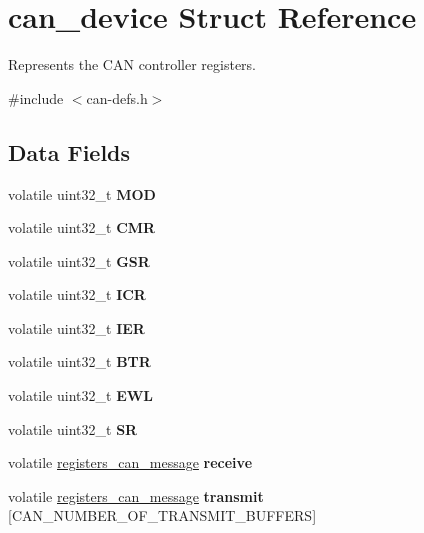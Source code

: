 \hypertarget{structcan__device}{}\section{can\+\_\+device Struct Reference}
\label{structcan__device}


Represents the C\+AN controller registers.  




{\ttfamily \#include $<$can-\/defs.\+h$>$}

\subsection*{Data Fields}
\begin{DoxyCompactItemize}
\item 
\mbox{\label{structcan__device_afde4517432c0902db0ea32e5472b9984}} 
volatile uint32\+\_\+t {\bfseries M\+OD}
\item 
\mbox{\label{structcan__device_a8bbfce69e0ebbd0cd78f6002152c2a30}} 
volatile uint32\+\_\+t {\bfseries C\+MR}
\item 
\mbox{\label{structcan__device_a988fc65276041a6fb98b880f40e801ac}} 
volatile uint32\+\_\+t {\bfseries G\+SR}
\item 
\mbox{\label{structcan__device_a3287b7fdd329d6200927f8292bd57dda}} 
volatile uint32\+\_\+t {\bfseries I\+CR}
\item 
\mbox{\label{structcan__device_a15294efecd575d59d250d87380e73990}} 
volatile uint32\+\_\+t {\bfseries I\+ER}
\item 
\mbox{\label{structcan__device_ac61c4f699eb360c6aff3dcbd83bfb26c}} 
volatile uint32\+\_\+t {\bfseries B\+TR}
\item 
\mbox{\label{structcan__device_ac7da135f2b9f2a7ff61309b405b6aaa1}} 
volatile uint32\+\_\+t {\bfseries E\+WL}
\item 
\mbox{\label{structcan__device_ac972d8fead02a8a01441d01ecc3965a0}} 
volatile uint32\+\_\+t {\bfseries SR}
\item 
\mbox{\label{structcan__device_a6ca405ba79ddc19b5115ab972cd5abc3}} 
volatile \mbox{\hyperlink{structregisters__can__message}{registers\+\_\+can\+\_\+message}} {\bfseries receive}
\item 
\mbox{\label{structcan__device_aada350b765970ca7da2350cd06d8c879}} 
volatile \mbox{\hyperlink{structregisters__can__message}{registers\+\_\+can\+\_\+message}} {\bfseries transmit} \mbox{[}C\+A\+N\+\_\+\+N\+U\+M\+B\+E\+R\+\_\+\+O\+F\+\_\+\+T\+R\+A\+N\+S\+M\+I\+T\+\_\+\+B\+U\+F\+F\+E\+RS\mbox{]}
\end{DoxyCompactItemize}


